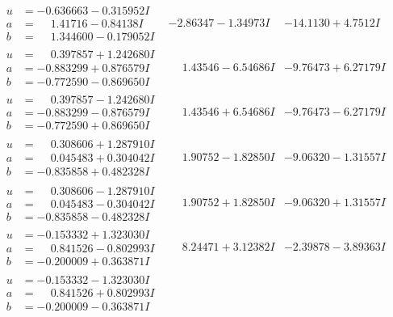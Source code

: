 \documentclass[1p]{elsarticle_modified}
\theoremstyle{definition}
\begin{document}
$$\begin{array}{c|c|c}
\begin{aligned}
u &= -0.636663 - 0.315952 I \\
a &= \phantom{-}1.41716 - 0.84138 I \\
b &= \phantom{-}1.344600 - 0.179052 I\end{aligned}
 & -2.86347 - 1.34973 I & -14.1130 + 4.7512 I \\ \hline\begin{aligned}
u &= \phantom{-}0.397857 + 1.242680 I \\
a &= -0.883299 + 0.876579 I \\
b &= -0.772590 - 0.869650 I\end{aligned}
 & \phantom{-}1.43546 - 6.54686 I & -9.76473 + 6.27179 I \\ \hline\begin{aligned}
u &= \phantom{-}0.397857 - 1.242680 I \\
a &= -0.883299 - 0.876579 I \\
b &= -0.772590 + 0.869650 I\end{aligned}
 & \phantom{-}1.43546 + 6.54686 I & -9.76473 - 6.27179 I \\ \hline\begin{aligned}
u &= \phantom{-}0.308606 + 1.287910 I \\
a &= \phantom{-}0.045483 + 0.304042 I \\
b &= -0.835858 + 0.482328 I\end{aligned}
 & \phantom{-}1.90752 - 1.82850 I & -9.06320 - 1.31557 I \\ \hline\begin{aligned}
u &= \phantom{-}0.308606 - 1.287910 I \\
a &= \phantom{-}0.045483 - 0.304042 I \\
b &= -0.835858 - 0.482328 I\end{aligned}
 & \phantom{-}1.90752 + 1.82850 I & -9.06320 + 1.31557 I \\ \hline\begin{aligned}
u &= -0.153332 + 1.323030 I \\
a &= \phantom{-}0.841526 - 0.802993 I \\
b &= -0.200009 + 0.363871 I\end{aligned}
 & \phantom{-}8.24471 + 3.12382 I & -2.39878 - 3.89363 I \\ \hline\begin{aligned}
u &= -0.153332 - 1.323030 I \\
a &= \phantom{-}0.841526 + 0.802993 I \\
b &= -0.200009 - 0.363871 I\end{aligned}

\end{array}$$
\end{document}
